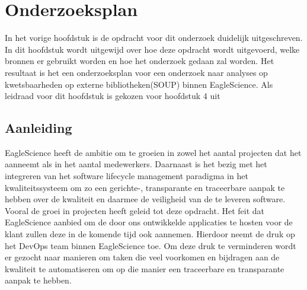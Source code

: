 \chapter{Onderzoeksplan}\label{ch:onderzoekPlan}

In het vorige hoofdstuk is de opdracht voor dit onderzoek duidelijk uitgeschreven. In dit hoofdstuk wordt uitgewijd over hoe deze opdracht wordt uitgevoerd, welke bronnen er gebruikt worden en hoe het onderzoek gedaan zal worden. Het resultaat is het een onderzoeksplan voor een onderzoek naar analyses op kwetsbaarheden op externe bibliotheken(SOUP) binnen EagleScience. Als leidraad voor dit hoofdstuk is gekozen voor hoofdstuk 4 uit~\cite{JanLeen2017}

\section{Aanleiding}\label{sec:OP_aanleiding}
EagleScience heeft de ambitie om te groeien in zowel het aantal projecten dat het aanneemt als in het aantal medewerkers. Daarnaast is het bezig met het integreren van het software lifecycle management paradigma in het kwaliteitssysteem om zo een gerichte-, transparante en traceerbare aanpak te hebben over de kwaliteit en daarmee de veiligheid van de te leveren software. Vooral de groei in projecten heeft geleid tot deze opdracht. Het feit dat EagleScience aanbied om de door ons ontwikkelde applicaties te hosten voor de klant zullen deze in de komende tijd ook aannemen. Hierdoor neemt de druk op het DevOps team binnen EagleScience toe. Om deze druk te verminderen wordt er gezocht naar manieren om taken die veel voorkomen en bijdragen aan de kwaliteit te automatiseren om op die manier een traceerbare en transparante aanpak te hebben.

